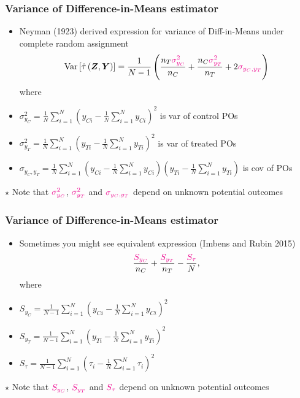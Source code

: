 \documentclass[table, xcolor = {dvipsnames}, 9pt]{beamer}
\theoremstyle{plain}
\newcommand{\mh}[1]{{\color{magenta}{#1}}}
\DeclareMathOperator{\Var}{\rm{Var}}
\begin{document}
\begin{frame}
\frametitle{Variance of Difference-in-Means estimator}
\begin{itemize}
\item Neyman (1923) derived expression for variance of Diff-in-Means under complete random assignment
\begin{equation*}
\Var\left[\hat{\tau}\left(\bm{Z}, \bm{Y}\right)\right] = \frac{1}{N - 1}\left(\frac{n_T \mh{\sigma^2_{y_C}}}{n_C} + \frac{n_C \mh{\sigma^2_{y_T}}}{n_T} + 2\mh{\sigma_{y_C, y_T}}\right)
\end{equation*}  
where 
\item[] $\sigma^2_{y_C} = \frac{1}{N} \sum \limits_{i = 1}^N \left(y_{Ci} - \frac{1}{N} \sum \limits_{i = 1}^N y_{Ci}\right)^2$ is var of control POs
\item[] $\sigma^2_{y_T} = \frac{1}{N} \sum \limits_{i = 1}^N \left(y_{Ti} - \frac{1}{N} \sum \limits_{i = 1}^N y_{Ti}\right)^2$ is var of treated POs
\item[] $\sigma_{y_C, y_T} = \frac{1}{N} \sum \limits_{i = 1}^N \left(y_{Ci} - \frac{1}{N} \sum \limits_{i = 1}^N y_{Ci}\right)\left(y_{Ti} - \frac{1}{N} \sum \limits_{i = 1}^N y_{Ti}\right)$ is cov of POs
\end{itemize} \pause
\vspace{1em}
$\star$ Note that $\mh{\sigma^2_{y_C}}$, $\mh{\sigma^2_{y_T}}$ and $\mh{\sigma_{y_C, y_T}}$ depend on unknown potential outcomes
\end{frame}
\begin{frame}
\frametitle{Variance of Difference-in-Means estimator}
\begin{itemize}
\item Sometimes you might see equivalent expression (Imbens and Rubin 2015)
\begin{equation*}
\dfrac{\mh{S_{y_C}}}{n_C} + \dfrac{\mh{S_{y_T}}}{n_T} - \dfrac{\mh{S_{\tau}}}{N},
\end{equation*}
where
\item[] $S_{y_C} = \frac{1}{N - 1} \sum \limits_{i = 1}^N \left(y_{Ci} - \frac{1}{N} \sum \limits_{i = 1}^N y_{Ci}\right)^2$
\item[] $S_{y_T} = \frac{1}{N - 1} \sum \limits_{i = 1}^N \left(y_{Ti} - \frac{1}{N} \sum \limits_{i = 1}^N y_{Ti}\right)^2$ 
\item[] $S_{\tau} = \frac{1}{N - 1} \sum \limits_{i = 1}^N \left(\tau_i - \frac{1}{N} \sum \limits_{i = 1}^N \tau_i\right)^2$
\end{itemize} \pause
\vspace{1em}
$\star$ Note that $\mh{S_{y_C}}$, $\mh{S_{y_T}}$ and $\mh{S_{\tau}}$ depend on unknown potential outcomes
\end{frame}
\end{document}

